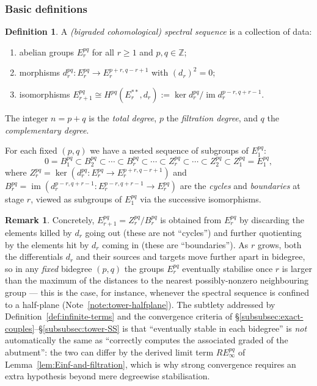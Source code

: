 \documentclass[12pt,a4paper]{article}
\theoremstyle{definition}
\newtheorem{definition}[theorem]{Definition}
\newtheorem{remark}[theorem]{Remark}
\newcommand{\Z}{\mathbb{Z}}
\begin{document}
\subsubsection{Basic definitions}

\begin{definition}\label{def:spectral-sequence}
A \emph{(bigraded cohomological) spectral sequence} is a collection of data:
\begin{enumerate}
  \item abelian groups $E_r^{pq}$ for all $r\geq 1$ and $p,q\in\Z$;
  \item morphisms $d_r^{pq}:E_r^{pq}\to E_r^{p+r,q-r+1}$ with $(d_r)^2=0$;
  \item isomorphisms $E_{r+1}^{pq}\cong H^{pq}(E_r^{**},d_r)
    :=\ker d_r^{pq}\big/\operatorname{im} d_r^{p-r,q+r-1}$.
\end{enumerate}
The integer $n=p+q$ is the \emph{total degree}, $p$ the \emph{filtration degree},
and $q$ the \emph{complementary degree}.
\end{definition}

For each fixed $(p,q)$ we have a nested sequence of subgroups of $E_1^{pq}$:
\[
  0 = B_1^{pq} \subset B_2^{pq} \subset \cdots \subset B_r^{pq}
  \subset \cdots \subset Z_r^{pq} \subset \cdots \subset Z_2^{pq}
  \subset Z_1^{pq} = E_1^{pq},
\]
where $Z_r^{pq}=\ker(d_r^{pq}:E_r^{pq}\to E_r^{p+r,q-r+1})$ and
$B_r^{pq}=\operatorname{im}(d_r^{p-r,q+r-1}:E_r^{p-r,q+r-1}\to E_r^{pq})$
are the \emph{cycles} and \emph{boundaries} at stage $r$, viewed as subgroups
of $E_1^{pq}$ via the successive isomorphisms.

\begin{remark}
Concretely, $E_{r+1}^{pq}=Z_r^{pq}/B_r^{pq}$ is obtained from $E_r^{pq}$ by
discarding the elements killed by $d_r$ going out (these are not ``cycles'') and
further quotienting by the elements hit by $d_r$ coming in (these are
``boundaries'').  As $r$ grows, both the differentials $d_r$ and their sources and
targets move further apart in bidegree, so in any \emph{fixed} bidegree $(p,q)$ the
groups $E_r^{pq}$ eventually stabilise once $r$ is larger than the maximum of the
distances to the nearest possibly-nonzero neighbouring group — this is the case,
for instance, whenever the spectral sequence is confined to a half-plane
(Note~\ref{note:tower-halfplane}).  The subtlety addressed by
Definition~\ref{def:infinite-terms} and the convergence criteria of
\S\ref{subsubsec:exact-couples}--\S\ref{subsubsec:tower-SS} is that ``eventually
stable in each bidegree'' is \emph{not} automatically the same as ``correctly
computes the associated graded of the abutment'': the two can differ by the
derived limit term $RE_\infty^{pq}$ of Lemma~\ref{lem:Einf-and-filtration}, which
is why strong convergence requires an extra hypothesis beyond mere degreewise
stabilisation.
\end{remark}
\end{document}
